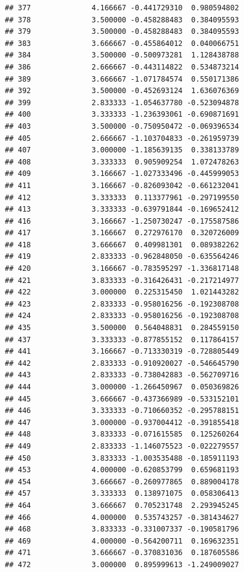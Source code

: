 \documentclass[
]{article}
\begin{document}
\begin{verbatim}
## 377              4.166667 -0.441729310  0.980594802
## 378              3.500000 -0.458288483  0.384095593
## 379              3.500000 -0.458288483  0.384095593
## 383              3.666667 -0.455864012  0.040066751
## 384              3.500000 -0.500973281  1.128438788
## 386              2.666667 -0.443114822  0.534873214
## 389              3.666667 -1.071784574  0.550171386
## 392              3.500000 -0.452693124  1.636076369
## 399              2.833333 -1.054637780 -0.523094878
## 400              3.333333 -1.236393061 -0.690871691
## 403              3.500000 -0.750950472 -0.069396534
## 405              2.666667 -1.103704833 -0.261959739
## 407              3.000000 -1.185639135  0.338133789
## 408              3.333333  0.905909254  1.072478263
## 409              3.166667 -1.027333496 -0.445999053
## 411              3.166667 -0.826093042 -0.661232041
## 412              3.333333  0.113377961 -0.297199550
## 413              3.333333 -0.639791844 -0.169652412
## 416              3.166667 -1.250730247 -0.175587586
## 417              3.166667  0.272976170  0.320726009
## 418              3.666667  0.409981301  0.089382262
## 419              2.833333 -0.962848050 -0.635564246
## 420              3.166667 -0.783595297 -1.336817148
## 421              3.833333 -0.316426431 -0.217214977
## 422              3.000000  0.225315450  1.021443282
## 423              2.833333 -0.958016256 -0.192308708
## 424              2.833333 -0.958016256 -0.192308708
## 435              3.500000  0.564048831  0.284559150
## 437              3.333333 -0.877855152  0.117864157
## 441              3.166667 -0.713330319 -0.728805449
## 442              2.833333 -0.910920027 -0.546645790
## 443              2.833333 -0.738042883 -0.562709716
## 444              3.000000 -1.266450967  0.050369826
## 445              3.666667 -0.437366989 -0.533152101
## 446              3.333333 -0.710660352 -0.295788151
## 447              3.000000 -0.937004412 -0.391855418
## 448              3.833333 -0.071615585  0.125260264
## 449              2.833333 -1.146075523 -0.022279557
## 450              3.833333 -1.003535488 -0.185911193
## 453              4.000000 -0.620853799  0.659681193
## 454              3.666667 -0.260977865  0.889004178
## 457              3.333333  0.138971075  0.058306413
## 464              3.666667  0.705231748  2.293945245
## 466              4.000000  0.535743257 -0.381434627
## 468              3.833333 -0.331007337 -0.190581796
## 469              4.000000 -0.564200711  0.169632351
## 471              3.666667 -0.370831036  0.187605586
## 472              3.000000  0.895999613 -1.249009027

\end{verbatim}
\end{document}
